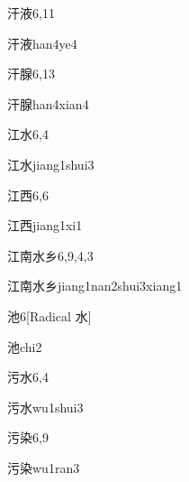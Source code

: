 \begin{entry}{汗液}{6,11}
  \begin{phonetics}{汗液}{han4ye4}
  \end{phonetics}
\end{entry}

\begin{entry}{汗腺}{6,13}
  \begin{phonetics}{汗腺}{han4xian4}
  \end{phonetics}
\end{entry}

\begin{entry}{江水}{6,4}
  \begin{phonetics}{江水}{jiang1shui3}
  \end{phonetics}
\end{entry}

\begin{entry}{江西}{6,6}
  \begin{phonetics}{江西}{jiang1xi1}
  \end{phonetics}
\end{entry}

\begin{entry}{江南水乡}{6,9,4,3}
  \begin{phonetics}{江南水乡}{jiang1nan2shui3xiang1}
  \end{phonetics}
\end{entry}

\begin{entry}{池}{6}[Radical 水]
  \begin{phonetics}{池}{chi2}
  \end{phonetics}
\end{entry}

\begin{entry}{污水}{6,4}
  \begin{phonetics}{污水}{wu1shui3}
  \end{phonetics}
\end{entry}

\begin{entry}{污染}{6,9}
  \begin{phonetics}{污染}{wu1ran3}
  \end{phonetics}
\end{entry}

